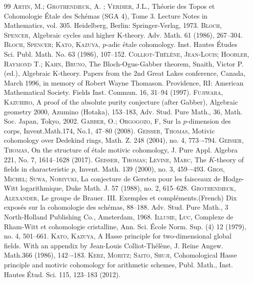 \documentclass{article}
\begin{document}
%
\begin{thebibliography}{99}
\textsc{Artin, M.; Grothendieck, A. ; Verdier, J.L.},
Th\'{e}orie des Topos et Cohomologie \'{E}tale des Sch\'{e}mas
(SGA 4), Tome 3.
Lecture Notes in Mathematics, vol. 305. Heidelberg, Berlin:
Springer-Verlag, 1973.
\textsc{Bloch, Spencer},
Algebraic cycles and higher K-theory. 
Adv. Math. 61 (1986), 267--304.
\textsc{Bloch, Spencer; Kato, Kazuya},
$p$-adic \'{e}tale cohomology. 
Inst. Hautes \'{E}tudes Sci. Publ. Math. No. 63 (1986), 107--152.
\textsc{
Colliot-Th\'{e}l\`{e}ne, Jean-Louis; 
Hoobler, Raymond T.; Kahn, Bruno},
The Bloch-Ogus-Gabber theorem,
Snaith, Victor P. (ed.), Algebraic K-theory. 
Papers from the 2nd Great Lakes conference, Canada, March 1996, 
in memory of Robert Wayne Thomason. 
Providence, RI: 
American Mathematical Society. Fields Inst. Commun. 16, 31--94 (1997).
\textsc{Fujiwara, Kazuhiro},
A proof of the absolute purity conjecture (after Gabber), 
Algebraic geometry 2000, Azumino (Hotaka), 153--183, 
Adv. Stud. Pure Math., 36, Math.
Soc. Japan, Tokyo, 2002.
\textsc{Gabber, O.; Orgogozo, F},
Sur la $p$-dimension des corps,
Invent.Math.174,
No.1,
47--80
(2008).
\textsc{Geisser, Thomas},
Motivic cohomology over Dedekind rings,
Math. Z. 248 (2004), no. 4, 773–-794. 
\textsc{Geisser, Thomas},
On the structure of \'{e}tale motivic cohomology,
J. Pure Appl. Algebra 221, No. 7, 1614--1628 (2017).
\textsc{Geisser, Thomas; Levine, Marc},
The $K$-theory of fields in characteristic $p$,
Invent. Math. 139 (2000), no. 3, 459–-493. 
\textsc{Gros, Michel; Suwa, Noriyuki},
La conjecture de Gersten pour les faisceaux de
Hodge-{W}itt logarithmique,
Duke Math. J. 57 (1988),
no. 2, 615--628.
\textsc{Grothendieck, Alexander},
Le groupe de Brauer. III. Exemples et compl\'{e}ments.(French)
Dix expos\'{e}s sur la cohomologie des sch\'{e}mas, 88--188.
Adv. Stud. Pure Math., 3
North-Holland Publishing Co., Amsterdam, 1968.
\textsc{Illusie, Luc},
Complexe de Rham-Witt et cohomologie cristalline,
Ann. Sci. \'{E}cole Norm. Sup. (4) 12 (1979),
no. 4, 501--661.
\textsc{Kato, Kazuya},
A Hasse principle for two-dimensional global fields.
With an appendix by Jean-Louis Colliot-Th\'{e}l\`{e}ne,
J. Reine Angew. Math.366 (1986), 142–-183.
\textsc{Kerz, Moritz; Saito, Shuji},
Cohomological Hasse principle and motivic cohomology for arithmetic schemes,
Publ. Math., Inst. Hautes \'{E}tud. Sci. 115, 123--183 (2012).

\end{thebibliography}
\end{document}
